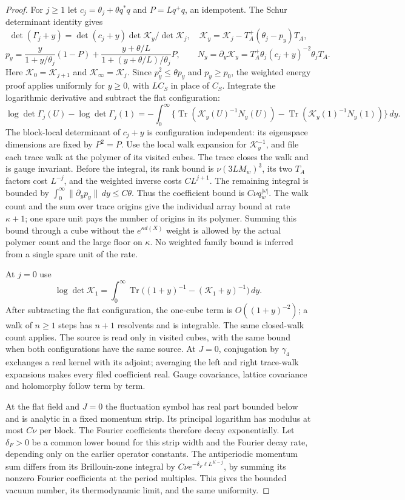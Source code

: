 \documentclass[11pt,letterpaper,reqno]{amsart}
\theoremstyle{definition}
\theoremstyle{remark}
\begin{document}
\begin{proof}
For $j\ge1$ let $c_j=\theta_j+\theta q^*q$ and
$P=Lq^+q$, an idempotent.  The Schur determinant identity gives
\[
 \det(\Gamma_j+y)=\det(c_j+y)\det\mathcal K_y/\det\mathcal K_j,
 \quad
 \mathcal K_y=\mathcal K_j-T_A^+(\theta_j-p_y)T_A,
\]
\[
 p_y=\frac{y}{1+y/\theta_j}(1-P)+
       \frac{y+\theta/L}{1+(y+\theta/L)/\theta_j}P,
 \qquad N_y=\partial_y\mathcal K_y
       =T_A^+\theta_j(c_j+y)^{-2}\theta_jT_A.
\]
Here $\mathcal K_0=\mathcal K_{j+1}$ and
$\mathcal K_\infty=\mathcal K_j$.  Since
$p_y^2\le\theta p_y$ and $p_y\ge p_0$, the weighted energy
proof applies uniformly for $y\ge0$, with $LC_S$ in place of
$C_S$.  Integrate the logarithmic derivative and subtract the
flat configuration:
\[
 \log\det\Gamma_j(U)-\log\det\Gamma_j(1)
 =-\int_0^\infty\!\{\operatorname{Tr}(\mathcal K_y(U)^{-1}N_y(U))
       -\operatorname{Tr}(\mathcal K_y(1)^{-1}N_y(1))\}\,dy.
\]
The block-local determinant of $c_j+y$ is configuration independent:
its eigenspace dimensions are fixed by $P^2=P$.
Use the local walk expansion for $\mathcal K_y^{-1}$, and file
each trace walk at the polymer of its visited cubes.  The trace
closes the walk and is gauge invariant.  Before the integral,
its rank bound is $\nu(3LM_w)^3$, its two $T_A$ factors cost
$L^{-j}$, and the weighted inverse costs $CL^{j+1}$.
The remaining integral is bounded by
$\int_0^\infty\|\partial_yp_y\|\,dy\le C\theta$.
Thus the coefficient bound is $C\nu q_w^{|\omega|}$.
The walk count and the sum over trace origins give the
individual array bound at rate $\kappa+1$; one spare unit
pays the number of origins in its polymer.  Summing this
bound through a cube without the $e^{\kappa d(X)}$ weight
is allowed by the actual polymer count and the large
floor on $\kappa$.  No weighted family bound is inferred
from a single spare unit of the rate.

At $j=0$ use
\[
 \log\det\mathcal K_1=
 \int_0^\infty\operatorname{Tr}\bigl((1+y)^{-1}
                         -(\mathcal K_1+y)^{-1}\bigr)\,dy.
\]
After subtracting the flat configuration, the one-cube term is
$O((1+y)^{-2})$; a walk of $n\ge1$ steps has $n+1$
resolvents and is integrable.  The same closed-walk count applies.
The source is read only in visited cubes, with the same bound
when both configurations have the same source. At $J=0$, conjugation by
$\gamma_4$ exchanges a real kernel with its adjoint; averaging
the left and right trace-walk expansions makes every filed
coefficient real.  Gauge covariance, lattice covariance and
holomorphy follow term by term.

At the flat field and $J=0$ the fluctuation symbol has real part bounded
below and is analytic in a fixed momentum strip.  Its principal
logarithm has modulus at most $C\nu$ per block.  The Fourier
coefficients therefore decay exponentially. Let $\delta_F>0$ be
a common lower bound for this strip width and the Fourier decay
rate, depending only on the earlier operator constants. The antiperiodic
momentum sum differs from its Brillouin-zone integral by
$C\nu e^{-\delta_F\ell L^{K-j}}$, by summing its nonzero Fourier
coefficients at the period multiples.  This gives the bounded
vacuum number, its thermodynamic limit, and the same uniformity.
\end{proof}
\end{document}
